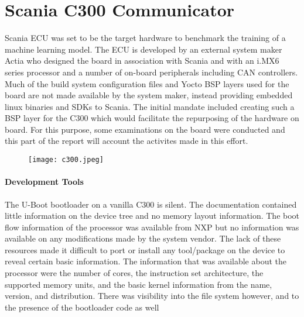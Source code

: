 \chapter{Scania C300 Communicator} \label{rtc-c300}

Scania ECU was set to be the target hardware to benchmark the training of a machine learning model. The ECU is developed by an external system maker Actia who designed the board in association with Scania and with an i.MX6 series processor and a number of on-board peripherals including CAN controllers. Much of the build system configuration files and Yocto BSP layers used for the board are not made available by the system maker, instead providing embedded linux binaries and SDKs to Scania. The initial mandate included creating such a BSP layer for the C300 which would facilitate the repurposing of the hardware on board. For this purpose, some examinations on the board were conducted and this part of the report will account the activites made in this effort.

\begin{figure}[h]
	\centering
	\texttt{[image: c300.jpeg]}
\end{figure}

\subsubsection*{Development Tools}

The U-Boot bootloader on a vanilla C300 is silent. The documentation contained little information on the device tree and no memory layout information. The boot flow information of the processor was available from NXP but no information was available on any modifications made by the system vendor. The lack of these resources made it difficult to port or install any tool/package on the device to reveal certain basic information. The information that was available about the processor were the number of cores, the instruction set architecture, the supported memory units, and the basic kernel information from the name, version, and distribution. There was visibility into the file system however, and to the presence of the bootloader code as well


